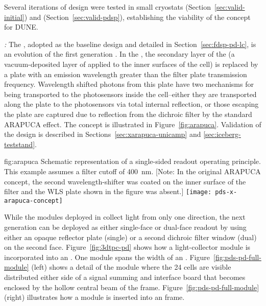 Several iterations of  design were tested in small cryostats (Section~\ref{sec:valid-initial}) and  (Section~\ref{sec:valid-pdsp}), establishing the viability of the concept for DUNE.

\textit{:} The , adopted as the baseline design and detailed in 
Section~\ref{sec:fdsp-pd-lc}, is an evolution of the first generation .  In the , the secondary  layer of the  (a vacuum-deposited layer of  applied to the inner surfaces of the cell) is replaced by a  plate with an emission wavelength greater than the filter plate transmission frequency.  Wavelength shifted photons from this plate have two mechanisms for being transported to the photosensors inside the cell--either they are transported along the  plate to the photosensors via total internal reflection, or those escaping the plate are captured due to reflection from the dichroic filter by the standard ARAPUCA effect.
The concept is illustrated in Figure~\ref{fig:arapuca}.
Validation of the  design is described in Sections~\ref{sec:xarapuca-unicamp} and \ref{sec:iceberg-teststand}.

\begin{dunefigure}{fig:arapuca}
{Schematic representation of a single-sided readout   operating principle.  This example assumes a filter cutoff of \SI{400}{nm}. [Note: In the original ARAPUCA concept, the second wavelength-shifter was coated on the inner surface of the filter and the WLS plate shown in the figure was absent.]}               
\texttt{[image: pds-x-arapuca-concept]}   
\end{dunefigure}

While the  modules deployed in  collect light from only one direction, the next generation  can be deployed as either single-face or dual-face readout by using either an opaque reflector plate (single) or a second dichroic filter window (dual) on the second face. 
Figure~\ref{fig:3dtpc-pd} shows how a light-collector module is incorporated into an . One module spans the width of an . Figure~\ref{fig:pds-pd-full-module} (left) shows a detail of the module where the 24  cells are visible distributed either side of a signal summing and interface board that becomes enclosed by the hollow central beam of the  frame. Figure~\ref{fig:pds-pd-full-module} (right) illustrates how a module is inserted into an  frame.


